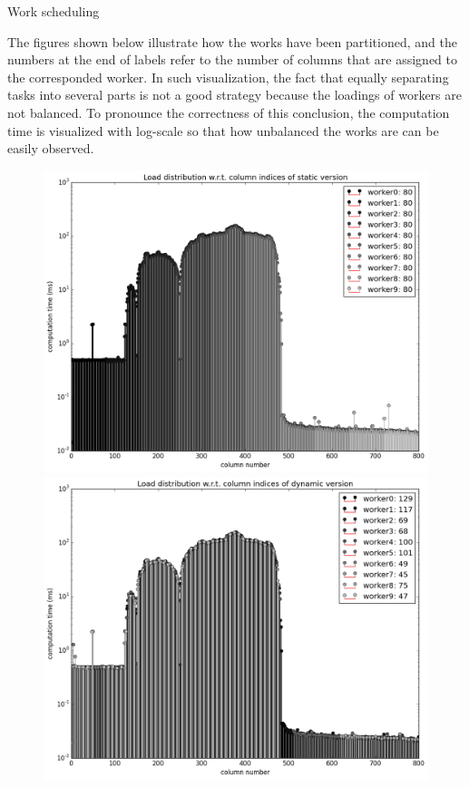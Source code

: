 \documentclass[12pt]{article}
\makeatletter
\renewenvironment{itemize}
{\list{$\bullet$}{\leftmargin\z@ \labelwidth\z@ \itemindent-\leftmargin
\let\makelabel\descriptionlabel}}
{\endlist}
\makeatother
\begin{document}
\begin{itemize}
    \item Work scheduling
    \begin{flushleft}
        The figures shown below illustrate how the works have been partitioned, and the numbers at the end of labels refer to the number of columns that are assigned to the corresponded worker. In such visualization, the fact that equally separating tasks into several parts is not a good strategy because the loadings of workers are not balanced. To pronounce the correctness of this conclusion, the computation time is visualized with log-scale so that how unbalanced the works are can be easily observed.
    \end{flushleft}
    \begin{figure}[ht]
        \hspace{-2cm}
        \begin{minipage}{.48\textwidth}
            \includegraphics[scale=.4]{./load_dist_static.png}
        \end{minipage}
        \hspace{2cm}
        \begin{minipage}{.48\textwidth}
            \includegraphics[scale=.4]{./load_dist_dynamic.png}
        \end{minipage}
    \end{figure}


\end{itemize}
\end{document}
